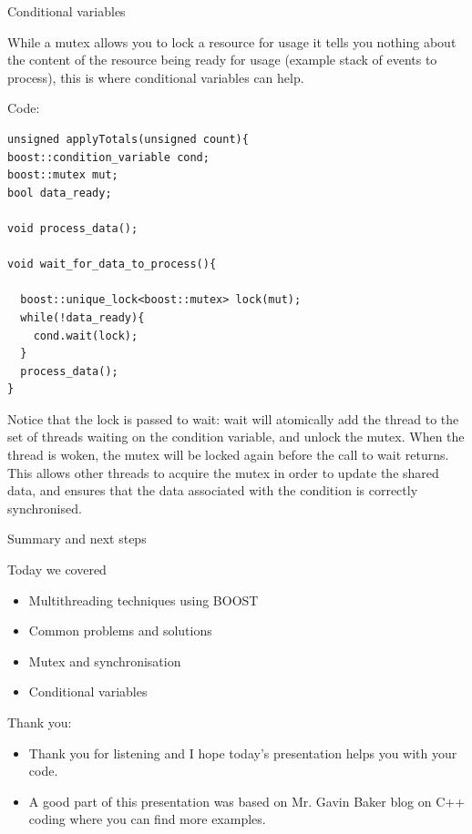\documentclass[8pt]{beamer}
\begin{document}
\begin{frame}[fragile]{Conditional variables}
 
While a mutex allows you to lock a resource for usage it tells you nothing about the content of the resource being ready for usage (example stack of events to process), this is where conditional variables can help.

\begin{exampleblock}{Code:}
 
\begin{lstlisting}
unsigned applyTotals(unsigned count){
boost::condition_variable cond;
boost::mutex mut;
bool data_ready;

void process_data();

void wait_for_data_to_process(){

  boost::unique_lock<boost::mutex> lock(mut);
  while(!data_ready){
    cond.wait(lock);
  }
  process_data();
}
\end{lstlisting}

\end{exampleblock}

Notice that the lock is passed to wait: wait will atomically add the thread to the set of threads waiting on the condition variable, and unlock the mutex. When the thread is woken, the mutex will be locked again before the call to wait returns. This allows other threads to acquire the mutex in order to update the shared data, and ensures that the data associated with the condition is correctly synchronised.
 
\end{frame}

\begin{frame}{Summary and next steps}
 
\begin{block}{Today we covered}
 
\begin{itemize}
  \item Multithreading techniques using BOOST
  \item Common problems and solutions
  \item Mutex and synchronisation
  \item Conditional variables
\end{itemize}

\end{block}

\begin{block}{Thank you:}
 
\begin{itemize}
  \item Thank you for listening and I hope today's presentation helps you with your code.
  \item A good part of this presentation was based on Mr. Gavin Baker blog on C++ coding where you can find more examples.
\end{itemize}
 
\end{block}

\end{frame}
\end{document}
